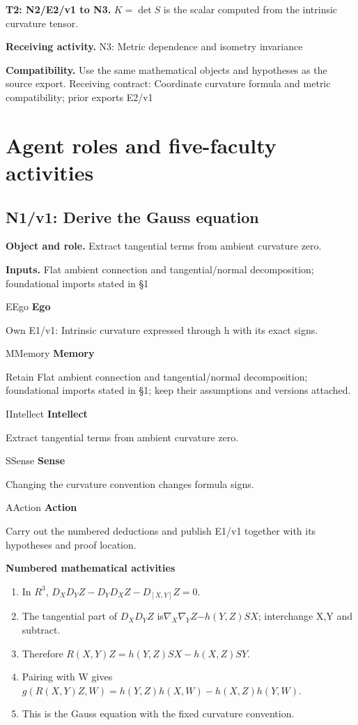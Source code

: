 \documentclass[preprint,12pt,aps,pra,showkeys,amsmath,amssymb,superscriptaddress,floatfix]{revtex4-2}
\theoremstyle{definition}
\theoremstyle{remark}
\newcommand{\mmfaculty}[3]{%
 \begin{mmfacultybox}{#1}{#2}
 {\sffamily\bfseries\color{MMBlue}#2}\par\smallskip #3
 \end{mmfacultybox}}
\newcommand{\field}[2]{\par\smallskip\noindent\textbf{#1.} #2\par}
\begin{document}
\field{T2: N2/E2/v1 to N3}{\(K=\operatorname{det} S\) is the scalar computed from the intrinsic
curvature tensor.}

\field{Receiving activity}{N3: Metric dependence and isometry invariance}

\field{Compatibility}{Use the same mathematical objects and hypotheses as the source export.
Receiving contract: Coordinate curvature formula and metric
compatibility; prior exports E2/v1}

\endgroup

\clearpage\section{Agent roles and five-faculty activities}\begingroup\small\linespread{1.05}\selectfont{}

\subsection{N1/v1: Derive the Gauss equation}

\field{Object and role}{Extract tangential terms from ambient curvature zero.}

\field{Inputs}{Flat ambient connection and tangential/normal decomposition;
foundational imports stated in §1}

\mmfaculty{E}{Ego}{Own E1/v1: Intrinsic curvature expressed through h with its exact signs.}

\mmfaculty{M}{Memory}{Retain Flat ambient connection and tangential/normal decomposition;
foundational imports stated in §1; keep their assumptions and versions
attached.}

\mmfaculty{I}{Intellect}{Extract tangential terms from ambient curvature zero.}

\mmfaculty{S}{Sense}{Changing the curvature convention changes formula signs.}

\mmfaculty{A}{Action}{Carry out the numbered deductions and publish E1/v1 together with its
hypotheses and proof location.}

\smallskip\noindent\textbf{Numbered mathematical activities}

\begin{enumerate}[label=N1.\arabic*,leftmargin=3.4em]

\item In \(R^{3}\), \(D_XD_YZ-D_YD_XZ-D_{[X,Y]}Z\)\(=0\).

\item The tangential part of \(D_XD_YZ\)
is\(\nabla_X\nabla_Y Z\)\(-h(Y,Z)SX\); interchange X,Y and subtract.

\item Therefore \(R(X,Y)Z=h(Y,Z)SX-h(X,Z)SY\).

\item Pairing with W gives \(g(R(X,Y)Z,W)=h(Y,Z)h(X,W)-h(X,Z)h(Y,W)\).

\item This is the Gauss equation with the fixed curvature convention.

\end{enumerate}
\end{document}
